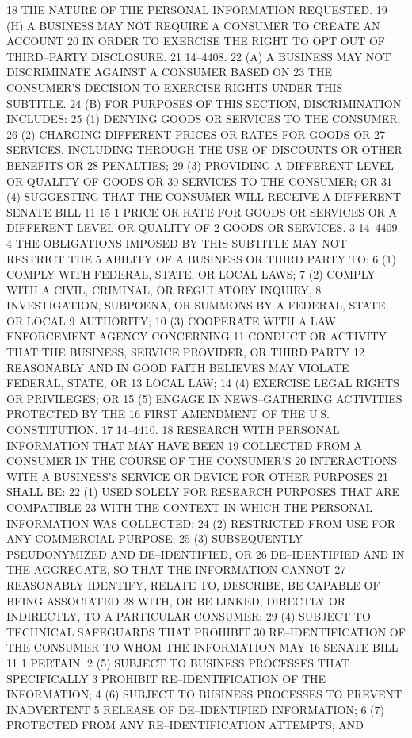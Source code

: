 18 THE NATURE OF THE PERSONAL INFORMATION REQUESTED.
19 (H) A BUSINESS MAY NOT REQUIRE A CONSUMER TO CREATE AN ACCOUNT
20 IN ORDER TO EXERCISE THE RIGHT TO OPT OUT OF THIRD–PARTY DISCLOSURE.
21 14–4408.
22 (A) A BUSINESS MAY NOT DISCRIMINATE AGAINST A CONSUMER BASED ON
23 THE CONSUMER’S DECISION TO EXERCISE RIGHTS UNDER THIS SUBTITLE.
24 (B) FOR PURPOSES OF THIS SECTION, DISCRIMINATION INCLUDES:
25 (1) DENYING GOODS OR SERVICES TO THE CONSUMER;
26 (2) CHARGING DIFFERENT PRICES OR RATES FOR GOODS OR
27 SERVICES, INCLUDING THROUGH THE USE OF DISCOUNTS OR OTHER BENEFITS OR
28 PENALTIES;
29 (3) PROVIDING A DIFFERENT LEVEL OR QUALITY OF GOODS OR
30 SERVICES TO THE CONSUMER; OR
31 (4) SUGGESTING THAT THE CONSUMER WILL RECEIVE A DIFFERENT 
SENATE BILL 11 15
1 PRICE OR RATE FOR GOODS OR SERVICES OR A DIFFERENT LEVEL OR QUALITY OF
2 GOODS OR SERVICES.
3 14–4409.
4 THE OBLIGATIONS IMPOSED BY THIS SUBTITLE MAY NOT RESTRICT THE
5 ABILITY OF A BUSINESS OR THIRD PARTY TO:
6 (1) COMPLY WITH FEDERAL, STATE, OR LOCAL LAWS;
7 (2) COMPLY WITH A CIVIL, CRIMINAL, OR REGULATORY INQUIRY,
8 INVESTIGATION, SUBPOENA, OR SUMMONS BY A FEDERAL, STATE, OR LOCAL
9 AUTHORITY;
10 (3) COOPERATE WITH A LAW ENFORCEMENT AGENCY CONCERNING
11 CONDUCT OR ACTIVITY THAT THE BUSINESS, SERVICE PROVIDER, OR THIRD PARTY
12 REASONABLY AND IN GOOD FAITH BELIEVES MAY VIOLATE FEDERAL, STATE, OR
13 LOCAL LAW;
14 (4) EXERCISE LEGAL RIGHTS OR PRIVILEGES; OR
15 (5) ENGAGE IN NEWS–GATHERING ACTIVITIES PROTECTED BY THE
16 FIRST AMENDMENT OF THE U.S. CONSTITUTION.
17 14–4410.
18 RESEARCH WITH PERSONAL INFORMATION THAT MAY HAVE BEEN
19 COLLECTED FROM A CONSUMER IN THE COURSE OF THE CONSUMER’S
20 INTERACTIONS WITH A BUSINESS’S SERVICE OR DEVICE FOR OTHER PURPOSES
21 SHALL BE:
22 (1) USED SOLELY FOR RESEARCH PURPOSES THAT ARE COMPATIBLE
23 WITH THE CONTEXT IN WHICH THE PERSONAL INFORMATION WAS COLLECTED;
24 (2) RESTRICTED FROM USE FOR ANY COMMERCIAL PURPOSE;
25 (3) SUBSEQUENTLY PSEUDONYMIZED AND DE–IDENTIFIED, OR
26 DE–IDENTIFIED AND IN THE AGGREGATE, SO THAT THE INFORMATION CANNOT
27 REASONABLY IDENTIFY, RELATE TO, DESCRIBE, BE CAPABLE OF BEING ASSOCIATED
28 WITH, OR BE LINKED, DIRECTLY OR INDIRECTLY, TO A PARTICULAR CONSUMER;
29 (4) SUBJECT TO TECHNICAL SAFEGUARDS THAT PROHIBIT
30 RE–IDENTIFICATION OF THE CONSUMER TO WHOM THE INFORMATION MAY 
16 SENATE BILL 11
1 PERTAIN;
2 (5) SUBJECT TO BUSINESS PROCESSES THAT SPECIFICALLY
3 PROHIBIT RE–IDENTIFICATION OF THE INFORMATION;
4 (6) SUBJECT TO BUSINESS PROCESSES TO PREVENT INADVERTENT
5 RELEASE OF DE–IDENTIFIED INFORMATION;
6 (7) PROTECTED FROM ANY RE–IDENTIFICATION ATTEMPTS; AND
